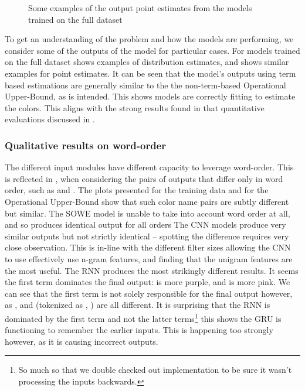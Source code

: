 \documentclass[11pt,a4paper]{article}
\begin{document}
\begin{figure}
	\caption{Some examples of the output point estimates from the models trained on the full dataset} \label{fig:pointout}
\end{figure}


To get an understanding of the problem and how the models are performing, we consider some of the outputs of the model for particular cases.
For models trained on the full dataset  shows examples of distribution estimates, and 
 shows similar examples for point estimates.
It can be seen that the model's outputs using term based estimations are generally similar to the the non-term-based Operational Upper-Bound, as is intended.
This shows models are correctly fitting to estimate the colors.
This aligns with the strong results found in that quantitative evaluations discussed in .

\subsubsection{Qualitative results on word-order}
The different input modules have different capacity to leverage word-order.
This is reflected in ,
when considering the pairs of outputs that differ only in word order, such as  and .
The plots presented for the training data and for the Operational Upper-Bound show that such color name pairs are subtly different but similar.
The SOWE model is unable to take into account word order at all, and so produces identical output for all orders
The CNN models produce very similar outputs but not strictly identical -- spotting the difference requires very close observation.
This is in-line with the different filter sizes allowing the CNN to use effectively use n-gram features, and finding that the unigram features are the most useful.
The RNN produces the most strikingly different results.
It seems the first term dominates the final output:  is more purple, and   is more pink.
We can see that the first term is not solely responsible for the final output however, as ,  and  (tokenized as , ) are all different.
It is surprising that the RNN is dominated by the first term and not the latter terms\footnote{So much so that we double checked out implementation to be sure it wasn't processing the inputs backwards.} this shows the GRU is functioning to remember the earlier inputs.
This is happening too strongly however, as it is causing incorrect outputs.
\end{document}
